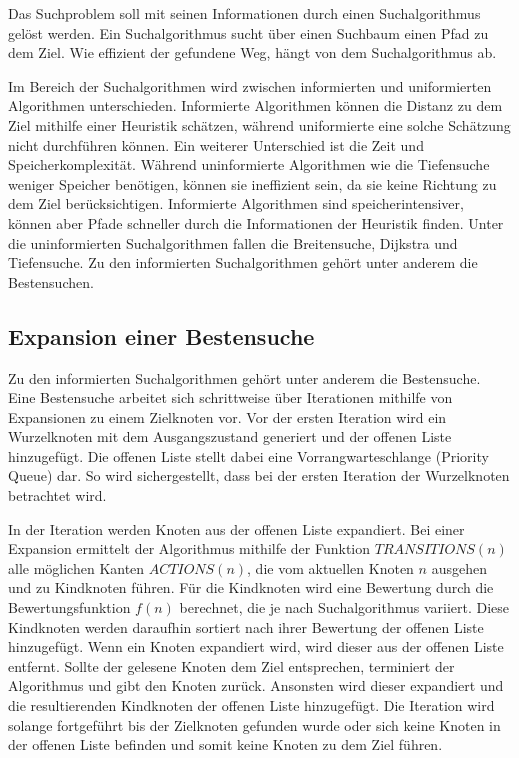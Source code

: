 Das Suchproblem soll mit seinen Informationen durch einen Suchalgorithmus gelöst werden. Ein Suchalgorithmus sucht über einen Suchbaum einen Pfad zu dem Ziel. Wie effizient der gefundene Weg, hängt von dem Suchalgorithmus ab. 

Im Bereich der Suchalgorithmen wird zwischen informierten und uniformierten Algorithmen unterschieden. Informierte Algorithmen können die Distanz zu dem Ziel mithilfe einer Heuristik schätzen, während uniformierte eine solche Schätzung nicht durchführen können. Ein weiterer Unterschied ist die Zeit und Speicherkomplexität. Während uninformierte Algorithmen wie die Tiefensuche weniger Speicher benötigen, können sie ineffizient sein, da sie keine Richtung zu dem Ziel berücksichtigen. Informierte Algorithmen sind speicherintensiver, können aber Pfade schneller durch die Informationen der Heuristik finden. Unter die uninformierten Suchalgorithmen fallen die Breitensuche, Dijkstra und Tiefensuche. Zu den informierten Suchalgorithmen gehört unter anderem die Bestensuchen.


\subsection{Expansion einer Bestensuche}

Zu den informierten Suchalgorithmen gehört unter anderem die Bestensuche. Eine Bestensuche arbeitet sich schrittweise über Iterationen mithilfe von Expansionen zu einem Zielknoten vor. Vor der ersten Iteration wird ein Wurzelknoten mit dem Ausgangszustand generiert und der offenen Liste hinzugefügt. Die offenen Liste stellt dabei eine Vorrangwarteschlange (Priority Queue) dar. So wird sichergestellt, dass bei der ersten Iteration der Wurzelknoten betrachtet wird.

In der Iteration werden Knoten aus der offenen Liste expandiert. Bei einer Expansion ermittelt der Algorithmus mithilfe der Funktion $TRANSITIONS(n)$ alle möglichen Kanten $ACTIONS(n)$, die vom aktuellen Knoten $n$ ausgehen und zu Kindknoten führen. Für die Kindknoten wird eine Bewertung durch die Bewertungsfunktion $f(n)$ berechnet, die je nach Suchalgorithmus variiert. Diese Kindknoten werden daraufhin sortiert nach ihrer Bewertung der offenen Liste hinzugefügt. Wenn ein Knoten expandiert wird, wird dieser aus der offenen Liste entfernt. Sollte der gelesene Knoten dem Ziel entsprechen, terminiert der Algorithmus und gibt den Knoten zurück. Ansonsten wird dieser expandiert und die resultierenden Kindknoten der offenen Liste hinzugefügt. Die Iteration wird solange fortgeführt bis der Zielknoten gefunden wurde oder sich keine Knoten in der offenen Liste befinden und somit keine Knoten zu dem Ziel führen.

